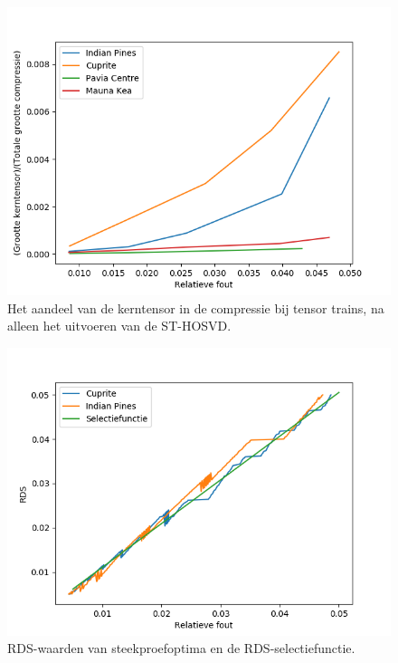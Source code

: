 \begin{enumerate}
\begin{enumerate}
\begin{figure}[H]
  \centering
  \includegraphics[scale=0.7]{images/tensor_trains_core_tensor_size.png}
  \caption{Het aandeel van de kerntensor in de compressie bij tensor trains, na alleen het uitvoeren van de ST-HOSVD.}
\label{fig:tensor-trains-core-tensor-size}
\end{figure}

\newpage
\begin{figure}[H]
  \centering
  \includegraphics[scale=0.7]{images/filtered_sweep_points_tensor_trains_RDS.png}
  \caption{RDS-waarden van steekproefoptima en de RDS-selectiefunctie.}
\label{fig:filtered-sweep-points-tensor-trains-RDS}
\end{figure}


\end{enumerate}
\end{enumerate}
